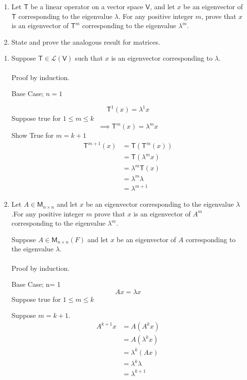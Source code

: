 \begin{enumerate}
\item
Let $\mathsf{T}$ be a linear operator on a vector space $\mathsf{V}$, and let $x$ be an
eigenvector of $\mathsf{T}$ corresponding to the eigenvalue
$\lambda$. For any positive integer $m$, prove that $x$ is an
eigenvector of $\mathsf{T}^m$ corresponding to the eigenvalue
$\lambda^m$.
\item State and prove the analogous result for matrices.
\end{enumerate}
\begin{enumerate}
\item Suppose  $\mathsf{T} \in \mathcal{L}(\mathsf{V})$ such that $x$
  is an eigenvector corresponding to $\lambda$.
\paragraph{}
Proof by induction.

Base Case; $n=1$

\begin{equation}
\mathsf{T}^1(x) = \lambda^1 x
\end{equation}
Suppose true for $1\leq m \leq k$ 
\begin{equation}
\implies \mathsf{T}^m(x) = \lambda^m x
\end{equation}
Show True for $m = k+1$ 
\begin{align}
\mathsf{T}^{m+1}(x) &= \mathsf{T}(\mathsf{T}^m(x))\\
&= \mathsf{T}(\lambda^m x)\\
&= \lambda^m\mathsf{T}(x)\\
&=\lambda^m \lambda\\
&= \lambda^{m+1}
\end{align}
\item Let $A \in \mathsf{M}_{n \times n}$ and let $x$ be an
  eigenvector corresponding to the eigenvalue $\lambda$ .For any
  positive integer $m$ prove that $x$ is an eigenvector of $A^m$
  corresponding to the eigenvalue $\lambda^m$.

Suppose $A \in \mathsf{M}_{n\times n}(F)$ and let $x$ be an
eigenvector of $A$ corresponding to the eigenvalue $\lambda$.
\paragraph{}
Proof by induction.

Base Case; n= 1
\begin{equation}
Ax = \lambda x
\end{equation}
Suppose true for $1 \leq m \leq k$

Suppose $m=k+1$.
\begin{align}
A^{k+1}x &= A(A^kx)\\
&= A(\lambda^k x)\\
&=\lambda^k(Ax)\\
&=\lambda^k\lambda\\
&=\lambda^{k+1}
\end{align}
\end{enumerate}
